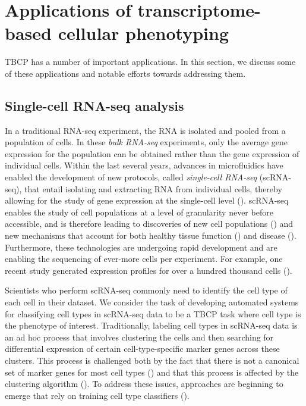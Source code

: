 \section{Applications of transcriptome-based cellular phenotyping}

TBCP has a number of important applications.  In this section, we discuss some of these applications and notable efforts towards addressing them.

\subsection{Single-cell RNA-seq analysis}

In a traditional RNA-seq experiment, the RNA is isolated and pooled from a population of cells. In these \textit{bulk RNA-seq} experiments, only the average gene expression for the population can be obtained rather than the gene expression of individual cells.   Within the last several years, advances in microfluidics have enabled the development of new protocols, called \textit{single-cell RNA-seq} (scRNA-seq), that entail isolating and extracting RNA from individual cells, thereby allowing for the study of gene expression at the single-cell level (\citealp{Tang2009}).  scRNA-seq enables the study of cell populations at a level of granularity never before accessible, and is therefore leading to discoveries of new cell populations (\citealp{Aizarani2019, Plasschaert2018}) and new mechanisms that account for both healthy tissue function (\citealp{Tikhonova2019, Economo2018}) and disease (\citealp{Mathys2019, Vladoiu2019}).  Furthermore, these technologies are undergoing rapid development and are enabling the sequencing of ever-more cells per experiment. For example, one recent study generated expression profiles for over a hundred thousand cells (\citealp{TabulaMuris2018}).

Scientists who perform scRNA-seq commonly need to identify the cell type of each cell in their dataset.  We consider the task of developing automated systems for classifying cell types in scRNA-seq data to be a TBCP task where cell type is the phenotype of interest.  Traditionally, labeling cell types in scRNA-seq data is an ad hoc process that involves clustering the cells and then searching for differential expression of certain cell-type-specific marker genes across these clusters. This process is challenged both by the fact that there is not a canonical set of marker genes for most cell types (\citealp{Zhang2018}) and that this process is affected by the clustering algorithm (\citealp{Kiselev2019}). To address these issues, approaches are beginning to emerge that rely on training cell type classifiers  (\citealp{Hou2019, Kanter2019, Xie2019, Aran2019, Lieberman2018, Alavi2018, Lin2017}).  

